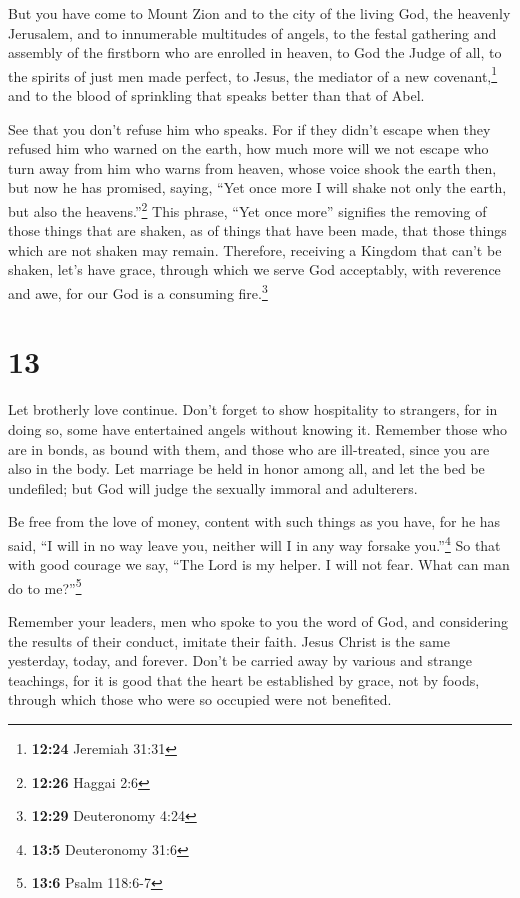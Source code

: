  But you have come to Mount Zion and to the city of the
living God, the heavenly Jerusalem, and to innumerable multitudes of
angels,  to the festal gathering and assembly of the
firstborn who are enrolled in heaven, to God the Judge of all, to the
spirits of just men made perfect,  to Jesus, the mediator
of a new covenant,\footnote{\textbf{12:24} Jeremiah 31:31} and to the
blood of sprinkling that speaks better than that of Abel.

 See that you don't refuse him who speaks. For if they
didn't escape when they refused him who warned on the earth, how much
more will we not escape who turn away from him who warns from heaven,
 whose voice shook the earth then, but now he has
promised, saying, ``Yet once more I will shake not only the earth, but
also the heavens.''\footnote{\textbf{12:26} Haggai 2:6} 
This phrase, ``Yet once more'' signifies the removing of those things
that are shaken, as of things that have been made, that those things
which are not shaken may remain.  Therefore, receiving a
Kingdom that can't be shaken, let's have grace, through which we serve
God acceptably, with reverence and awe,  for our God is a
consuming fire.\footnote{\textbf{12:29} Deuteronomy 4:24}

\hypertarget{section-12}{%
\section{13}\label{section-12}}

 Let brotherly love continue.  Don't forget
to show hospitality to strangers, for in doing so, some have entertained
angels without knowing it.  Remember those who are in
bonds, as bound with them, and those who are ill-treated, since you are
also in the body.  Let marriage be held in honor among
all, and let the bed be undefiled; but God will judge the sexually
immoral and adulterers.

 Be free from the love of money, content with such things
as you have, for he has said, ``I will in no way leave you, neither will
I in any way forsake you.''\footnote{\textbf{13:5} Deuteronomy 31:6}
 So that with good courage we say, ``The Lord is my
helper. I will not fear. What can man do to me?''\footnote{\textbf{13:6}
  Psalm 118:6-7}

 Remember your leaders, men who spoke to you the word of
God, and considering the results of their conduct, imitate their faith.
 Jesus Christ is the same yesterday, today, and forever.
 Don't be carried away by various and strange teachings,
for it is good that the heart be established by grace, not by foods,
through which those who were so occupied were not benefited.

